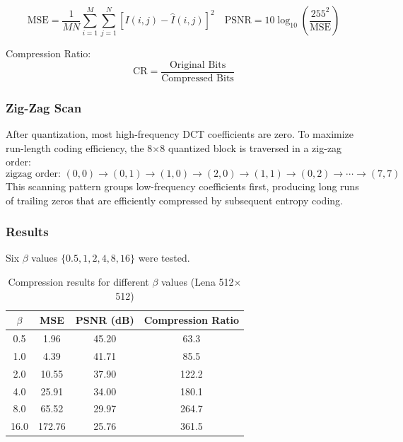 \documentclass[12pt, a4paper]{article}
\begin{document}
\begin{equation}
\text{MSE} = \frac{1}{MN}\sum_{i=1}^{M}\sum_{j=1}^{N}[I(i,j)-\hat{I}(i,j)]^2
\quad
\text{PSNR} = 10\log_{10}\left(\frac{255^2}{\text{MSE}}\right)
\label{eq:metrics_en}
\end{equation}

Compression Ratio:
\begin{equation}
\text{CR} = \frac{\text{Original Bits}}{\text{Compressed Bits}}
\label{eq:cr_en}
\end{equation}

\subsubsection{Zig-Zag Scan}
After quantization, most high-frequency DCT coefficients are zero. To maximize run-length coding efficiency, the 8$\times$8 quantized block is traversed in a zig-zag order:
\begin{equation}
\text{zigzag order: } (0,0) \to (0,1) \to (1,0) \to (2,0) \to (1,1) \to (0,2) \to \cdots \to (7,7)
\end{equation}
This scanning pattern groups low-frequency coefficients first, producing long runs of trailing zeros that are efficiently compressed by subsequent entropy coding.

\subsubsection{Results}

Six $\beta$ values $\{0.5, 1, 2, 4, 8, 16\}$ were tested.

\begin{table}[h]
\centering
\caption{Compression results for different $\beta$ values (Lena 512$\times$512)}
\label{tab:p1_en}
\begin{tabular}{c|c|c|c}
\toprule
$\beta$ & MSE & PSNR (dB) & Compression Ratio \\
\midrule
0.5  & 1.96  & 45.20 & 63.3 \\
1.0  & 4.39  & 41.71 & 85.5 \\
2.0  & 10.55 & 37.90 & 122.2 \\
4.0  & 25.91 & 34.00 & 180.1 \\
8.0  & 65.52 & 29.97 & 264.7 \\
16.0 & 172.76 & 25.76 & 361.5 \\
\bottomrule
\end{tabular}
\end{table}
\end{document}
